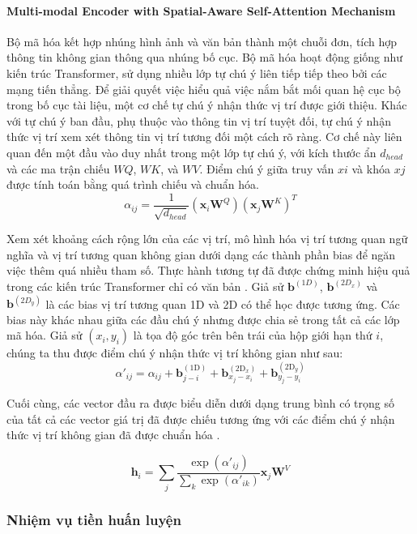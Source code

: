 \paragraph*{Multi-modal Encoder with Spatial-Aware Self-Attention Mechanism}
Bộ mã hóa kết hợp nhúng hình ảnh và văn bản thành một chuỗi đơn, tích hợp thông tin không gian thông qua nhúng bố cục. Bộ mã hóa hoạt động giống như kiến trúc Transformer, sử dụng nhiều lớp tự chú ý liên tiếp tiếp theo bởi các mạng tiến thẳng. Để giải quyết việc hiểu quả việc nắm bắt mối quan hệ cục bộ trong bố cục tài liệu, một cơ chế tự chú ý nhận thức vị trí được giới thiệu. Khác với tự chú ý ban đầu, phụ thuộc vào thông tin vị trí tuyệt đối, tự chú ý nhận thức vị trí xem xét thông tin vị trí tương đối một cách rõ ràng. Cơ chế này liên quan đến một đầu vào duy nhất trong một lớp tự chú ý, với kích thước ẩn $d_{head}$ và các ma trận chiếu $WQ$, $WK$, và $WV$. Điểm chú ý giữa truy vấn $xi$ và khóa $xj$ được tính toán bằng quá trình chiếu và chuẩn hóa.
\[
    \alpha_{ij} = \frac{1}{\sqrt{d_{head}}}(\mathbf{x}_i \mathbf{W}^Q) (\mathbf{x}_j \mathbf{W}^K)^T
\]

Xem xét khoảng cách rộng lớn của các vị trí, mô hình hóa vị trí tương quan ngữ nghĩa và vị trí tương quan không gian dưới dạng các thành phần bias để ngăn việc thêm quá nhiều tham số. Thực hành tương tự đã được chứng minh hiệu quả trong các kiến trúc Transformer chỉ có văn bản \cite{vaswani2023attention}. Giả sử $\mathbf{b}^{(1D)}$, $\mathbf{b}^{(2D_x)}$ và $\mathbf{b}^{(2D_y)}$ là các bias vị trí tương quan 1D và 2D có thể học được tương ứng. Các bias này khác nhau giữa các đầu chú ý nhưng được chia sẻ trong tất cả các lớp mã hóa. Giả sử $(x_i, y_i)$ là tọa độ góc trên bên trái của hộp giới hạn thứ $i$, chúng ta thu được điểm chú ý nhận thức vị trí không gian như sau:
\[
    \alpha'_{ij} = \alpha_{ij} + \mathbf{b}_{j-i}^{(1\text{D})} + \mathbf{b}_{x_j-x_i}^{(2\text{D}_x)} + \mathbf{b}_{y_j-y_i}^{(2\text{D}_y)}
\]

Cuối cùng, các vector đầu ra được biểu diễn dưới dạng trung bình có trọng số của tất cả các vector giá trị đã được chiếu tương ứng với các điểm chú ý nhận thức vị trí không gian đã được chuẩn hóa \cite{xu2022layoutlmv2}.

\[
    \mathbf{h}_i = \sum_j \frac{\exp(\alpha'_{ij})}{\sum_k \exp(\alpha'_{ik})} \mathbf{x}_j \mathbf{W}^V    
\]

\subsubsection{Nhiệm vụ tiền huấn luyện}
